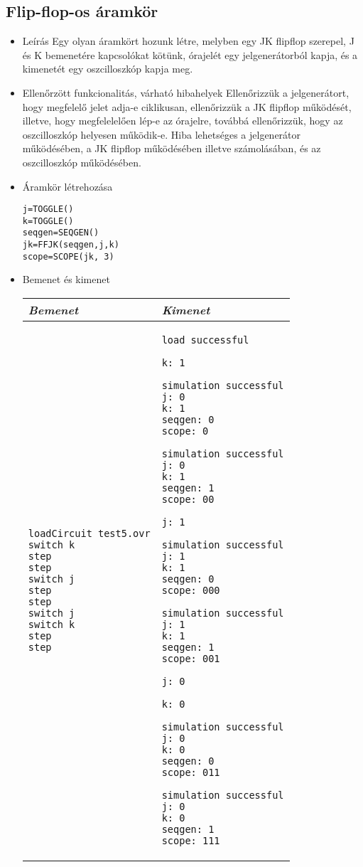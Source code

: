 \subsection{Flip-flop-os áramkör}
\begin{itemize}
\item Leírás\newline
Egy olyan áramkört hozunk létre, melyben egy JK flipflop szerepel, J és K bemenetére kapcsolókat kötünk, órajelét egy jelgenerátorból kapja, és a kimenetét egy oszcilloszkóp kapja meg.
\item Ellenőrzött funkcionalitás, várható hibahelyek\newline
Ellenőrizzük a jelgenerátort, hogy megfelelő jelet adja-e ciklikusan, ellenőrizzük a JK flipflop működését, illetve, hogy megfelelelően lép-e az órajelre, továbbá ellenőrizzük, hogy az oszcilloszkóp helyesen működik-e. Hiba lehetséges a jelgenerátor működésében, a JK flipflop működésében illetve számolásában, és az oszcilloszkóp működésében.

\item Áramkör létrehozása

\begin{verbatim}
j=TOGGLE()
k=TOGGLE()
seqgen=SEQGEN()
jk=FFJK(seqgen,j,k)
scope=SCOPE(jk, 3)
\end{verbatim}

\item Bemenet és kimenet\newline

\begin{tabular}{|p{7cm}|p{7cm}|} 
\hline 
\textit{Bemenet} & \textit{Kimenet} \\ \hline
\begin{verbatim}
loadCircuit test5.ovr
switch k
step
step
switch j
step
step
switch j
switch k
step
step
\end{verbatim}
& 
\begin{verbatim}
load successful

k: 1

simulation successful
j: 0
k: 1
seqgen: 0
scope: 0

simulation successful
j: 0
k: 1
seqgen: 1
scope: 00

j: 1

simulation successful
j: 1
k: 1
seqgen: 0
scope: 000

simulation successful
j: 1
k: 1
seqgen: 1
scope: 001

j: 0

k: 0

simulation successful
j: 0
k: 0
seqgen: 0
scope: 011

simulation successful
j: 0
k: 0
seqgen: 1
scope: 111
\end{verbatim}
\\ \hline
\end{tabular}

\end{itemize}


